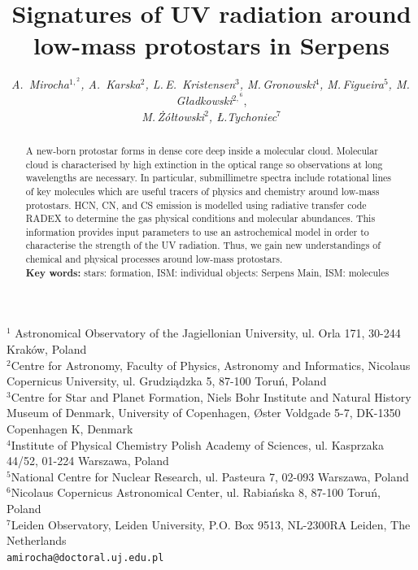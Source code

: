 \documentclass[a4paper]{article}
\begin{document}
\fontsize{11}{11}\selectfont %
\title{Signatures of UV radiation around low-mass protostars in Serpens}
\author{\textsl{A.~Mirocha$^{1,}^{2}$, A.~Karska$^{2}$, L.\,E.~Kristensen$^{3}$, M.\,Gronowski$^{4}$, M.\,Figueira$^{5}$, M.\, Gładkowski$^{2,}^{6}$}, \\  \textsl{M.\,Żółtowski$^{2}$, Ł.Tychoniec$^{7}$}}
\date{\vspace*{-6ex}}
\maketitle
\begin{center} {\small $^{1}$ Astronomical Observatory of the Jagiellonian University, ul. Orla 171, 30-244 Kraków, Poland\\
$^{2}$Centre for Astronomy, Faculty of Physics, Astronomy and Informatics, Nicolaus Copernicus University, ul. Grudziądzka 5, 87-100 Toruń, Poland\\
$^{3}$Centre for Star and Planet Formation, Niels Bohr Institute and Natural History Museum of Denmark, University of Copenhagen, Øster Voldgade 5-7, DK-1350 Copenhagen K, Denmark\\
$^{4}$Institute of Physical Chemistry Polish Academy of Sciences, ul. Kasprzaka 44/52, 01-224 Warszawa, Poland\\
$^{5}$National Centre for Nuclear Research, ul. Pasteura 7, 02-093 Warszawa, Poland\\
$^{6}$Nicolaus Copernicus Astronomical Center, ul. Rabiańska 8, 87-100 Toruń, Poland\\
$^{7}$Leiden Observatory, Leiden University, P.O. Box 9513, NL-2300RA Leiden, The Netherlands\\
{\tt amirocha@doctoral.uj.edu.pl}}
\end{center}

\begin{abstract}
A new-born protostar forms in dense core deep inside a molecular cloud. Molecular cloud is characterised by high extinction in the optical range so observations at long wavelengths are necessary. In particular, submillimetre spectra include rotational lines of key molecules which are useful tracers of physics and chemistry around low-mass protostars. HCN, CN, and CS emission is modelled using radiative transfer code RADEX to determine the gas physical conditions and molecular abundances. This information provides input parameters to use an astrochemical model in order to characterise the strength of the UV radiation. Thus, we gain new understandings of chemical and physical processes around low-mass protostars.\\[1ex]
{\bf Key words:} stars: formation, ISM: individual objects: Serpens Main, ISM: molecules
\end{abstract}
\end{document}
